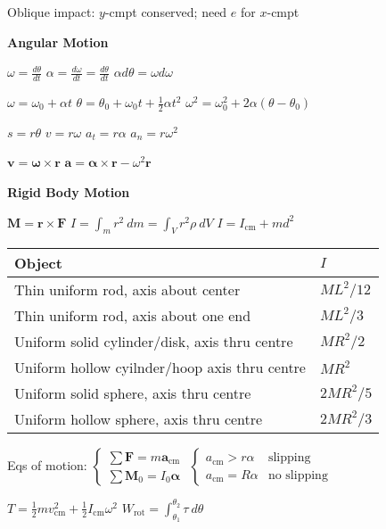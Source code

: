 \documentclass[twocolumn]{article}
\begin{document}

Oblique impact: $y$-cmpt conserved; need $e$ for $x$-cmpt


\clearpage


\textbf{Angular Motion}

$\omega = \frac{d\theta}{dt}$ \hfill $\alpha = \frac{d\omega}{dt} = \frac{d\theta}{dt}$ \hfill $\alpha d\theta = \omega d\omega$

$\omega = \omega_0 + \alpha t$ \hfill $\theta = \theta_0 + \omega_0 t + \frac{1}{2}\alpha t^2$ \hfill $\omega^2 = \omega_0^2 + 2 \alpha (\theta - \theta_0)$

$s = r \theta$ \hfill $v = r \omega$ \hfill $a_t = r \alpha$ \hfill $a_n = r \omega^2$

$\mathbf{v} = \boldsymbol\omega \times \mathbf{r}$ \hfill $\mathbf{a} = \boldsymbol\alpha \times \mathbf{r} - \omega^2 \mathbf{r}$

\vspace{-.5em}
\dotfill

\textbf{Rigid Body Motion}

$\mathbf{M} = \mathbf{r} \times \mathbf{F}$ \hfill $I = \int_m r^2\ dm = \int_V r^2 \rho\ dV$ \hfill $I = I_{\text{cm}} + md^2$

\vspace{-.5em}
\begin{table}[ht]
    \begin{tabular}{l | l}
        \toprule
        Object & $I$ \\
        \midrule
        Thin uniform rod, axis about center & $ML^2/12$ \\
        Thin uniform rod, axis about one end & $ML^2/3$ \\
        Uniform solid cylinder/disk, axis thru centre & $MR^2/2$ \\
        Uniform hollow cyilnder/hoop axis thru centre & $MR^2$ \\
        Uniform solid sphere, axis thru centre & $2MR^2/5$ \\
        Uniform hollow sphere, axis thru centre & $2MR^2/3$ \\
        \bottomrule
    \end{tabular}
\end{table} \vspace{-.5em}

Eqs of motion: $\begin{cases} \sum \mathbf{F} = m \mathbf{a}_{\text{cm}} \\ \sum \mathbf{M}_0 = I_0 \boldsymbol\alpha \end{cases}$ \hfill $\begin{cases} a_{\text{cm}} > r\alpha & \text{slipping} \\ a_{\text{cm}} = R\alpha & \text{no slipping} \end{cases}$

$T = \frac{1}{2} mv_{\text{cm}}^2 + \frac{1}{2} I_{\text{cm}} \omega^2$ \hfill $W_{\text{rot}} = \int_{\theta_1}^{\theta_2} \tau\ d\theta$
\end{document}
